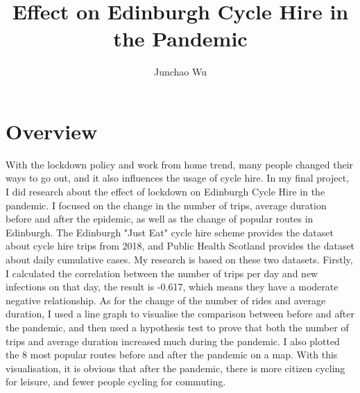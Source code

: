 \documentclass[11pt,a4paper]{article}
\title{Effect on Edinburgh Cycle Hire in the Pandemic}
\author{Junchao Wu}
\begin{document}
\maketitle


\section{Overview}
With the lockdown policy and work from home trend, many people changed their ways to go out, and it also influences the usage of cycle hire. In my final project, I did research about the effect of lockdown on Edinburgh Cycle Hire in the pandemic. I focused on the change in the number of trips, average duration before and after the epidemic, as well as the change of popular routes in Edinburgh. The Edinburgh "Just Eat" cycle hire scheme provides the dataset about cycle hire trips from 2018\cite{bike-share-dataset}, and Public Health Scotland provides the dataset about daily cumulative cases\cite{phs-dataset}. My research is based on these two datasets. Firstly, I calculated the correlation between the number of trips per day and new infections on that day, the result is -0.617, which means they have a moderate negative relationship. As for the change of the number of rides and average duration, I used a line graph to visualise the comparison between before and after the pandemic, and then used a hypothesis test to prove that both the number of trips and average duration increased much during the pandemic. I also plotted the 8 most popular routes before and after the pandemic on a map. With this visualisation, it is obvious that after the pandemic, there is more citizen cycling for leisure, and fewer people cycling for commuting.
\end{document}
